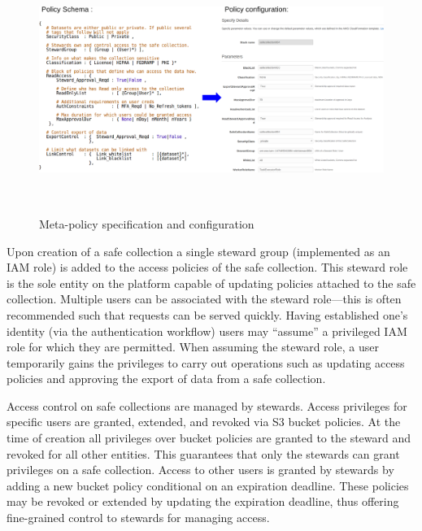 \begin{figure}[ht]
  \center
  \includegraphics[width=\textwidth, height=8cm]{figures/meta-policy.png}
  \caption{Meta-policy specification and configuration}
  \vspace{-1.5em}
  \label{fig:schema}
\end{figure}

Upon creation of a safe collection a single steward group (implemented as an IAM role) is added to the
access policies of the safe collection. This steward role is the sole entity on the platform capable of
updating policies attached to the safe collection.
Multiple users can be associated with the steward role---this is often recommended such 
that requests can be served quickly. 
Having established one's identity (via the \NAME authentication workflow) users 
may ``assume'' a privileged IAM role for which they are permitted. 
When assuming the steward role, a user temporarily gains the privileges to carry out operations such
as updating access policies and approving the export of data from a safe collection.

Access control on safe collections are managed by stewards. Access privileges for specific users
are granted, extended, and revoked via S3 bucket policies. At the time of creation all
privileges over bucket policies are granted to the steward and revoked for all other entities. This
guarantees that only the stewards can grant privileges on a safe collection. Access to other users 
is granted by stewards by adding a new bucket policy conditional on an expiration deadline. These policies may be revoked or
extended by updating the expiration deadline, thus offering fine-grained control to stewards for managing
access.

